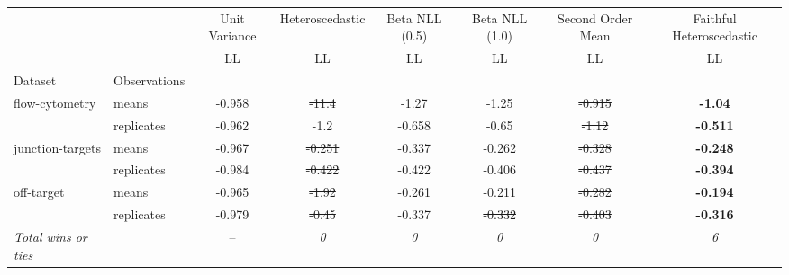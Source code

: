 \begin{tabular}{ll|c|c|c|c|c|c}
\toprule
{} & {} & {Unit Variance} & {Heteroscedastic} & {Beta NLL (0.5)} & {Beta NLL (1.0)} & {Second Order Mean} & {Faithful Heteroscedastic} \\
{} & {} & {LL} & {LL} & {LL} & {LL} & {LL} & {LL} \\
{Dataset} & {Observations} & {} & {} & {} & {} & {} & {} \\
\midrule
\multirow[t]{2}{*}{flow-cytometry} & means & -0.958 & \sout{-11.4} & -1.27 & -1.25 & \sout{-0.915} & \textbf{-1.04} \\
 & replicates & -0.962 & -1.2 & -0.658 & -0.65 & \sout{-1.12} & \textbf{-0.511} \\
\multirow[t]{2}{*}{junction-targets} & means & -0.967 & \sout{-0.251} & -0.337 & -0.262 & \sout{-0.328} & \textbf{-0.248} \\
 & replicates & -0.984 & \sout{-0.422} & -0.422 & -0.406 & \sout{-0.437} & \textbf{-0.394} \\
\multirow[t]{2}{*}{off-target} & means & -0.965 & \sout{-1.92} & -0.261 & -0.211 & \sout{-0.282} & \textbf{-0.194} \\
 & replicates & -0.979 & \sout{-0.45} & -0.337 & \sout{-0.332} & \sout{-0.403} & \textbf{-0.316} \\
\textit{{Total wins or ties}} &  & -- & \textit{0} & \textit{0} & \textit{0} & \textit{0} & \textit{6} \\
\bottomrule
\end{tabular}

